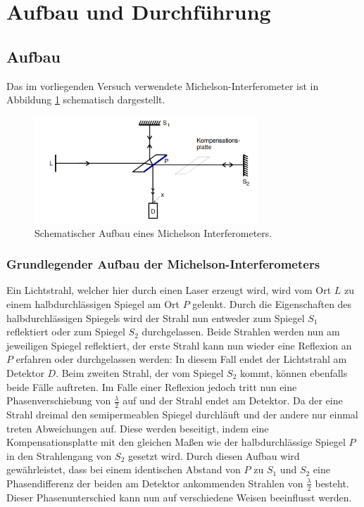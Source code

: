 \section{Aufbau und Durchführung}
\subsection{Aufbau}
\label{sec:Aufbau}

Das im vorliegenden Versuch verwendete Michelson-Interferometer ist in Abbildung \ref{abb:2} schematisch dargestellt.
\begin{figure}[H]
  \centering
  \includegraphics[height=4cm]{ressources/aufbau1.png}
  \caption{Schematischer Aufbau eines Michelson Interferometers. \cite{skript}}
  \label{abb:2}
\end{figure}

\subsubsection{Grundlegender Aufbau der Michelson-Interferometers}
Ein Lichtstrahl, welcher hier durch einen Laser erzeugt wird, wird vom Ort $L$ zu einem halbdurchlässigen Spiegel am Ort $P$ gelenkt.
Durch die Eigenschaften des halbdurchlässigen Spiegels wird der Strahl nun entweder zum Spiegel $S_1$ reflektiert oder zum Spiegel $S_2$ durchgelassen.
Beide Strahlen werden nun am jeweiligen Spiegel reflektiert, der erste Strahl kann nun wieder eine Reflexion an $P$ erfahren oder durchgelassen werden: In diesem Fall endet der Lichtstrahl am Detektor $D$.
Beim zweiten Strahl, der vom Spiegel $S_2$ kommt, können ebenfalls beide Fälle auftreten.
Im Falle einer Reflexion jedoch tritt nun eine Phasenverschiebung von $\frac{\lambda}{2}$ auf und der Strahl endet am Detektor.
Da der eine Strahl dreimal den semipermeablen Spiegel durchläuft und der andere nur einmal treten Abweichungen auf.
Diese werden beseitigt, indem eine Kompensationsplatte mit den gleichen Maßen wie der halbdurchlässige Spiegel $P$ in den Strahlengang von $S_2$ gesetzt wird.
Durch diesen Aufbau wird gewährleistet, dass bei einem identischen Abstand von $P$ zu $S_1$ und $S_2$ eine Phasendifferenz der beiden am Detektor ankommenden Strahlen von $\frac{\lambda}{2}$ besteht.
Dieser Phasenunterschied kann nun auf verschiedene Weisen beeinflusst werden.

